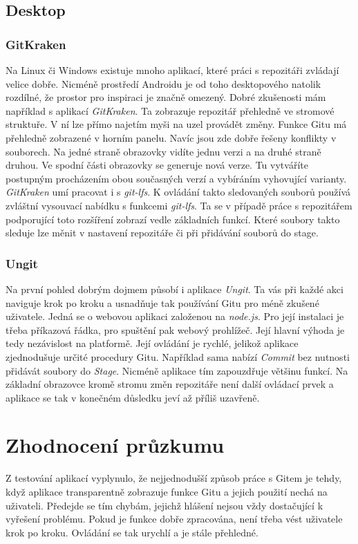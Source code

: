     \subsection {Desktop}
    \subsubsection{GitKraken}
    Na Linux či Windows existuje mnoho aplikací, které práci s repozitáři zvládají velice dobře. Nicméně prostředí Androidu je od toho desktopového natolik rozdílné, že prostor pro inspiraci je značně omezený. Dobré zkušenosti mám například s aplikací \emph{GitKraken}. Ta zobrazuje repozitář přehledně ve stromové struktuře. V ní lze přímo najetím myši na uzel provádět změny. Funkce Gitu má přehledně zobrazené v horním panelu. Navíc jsou zde dobře řešeny konflikty v souborech. Na jedné straně obrazovky vidíte jednu verzi a na druhé straně druhou. Ve spodní části obrazovky se generuje nová verze. Tu vytváříte postupným procházením obou současných verzí a vybíráním vyhovující varianty. \emph{GitKraken} umí pracovat i s \emph{git-lfs}. K ovládání takto sledovaných souborů používá zvláštní vysouvací nabídku s funkcemi \emph{git-lfs}. Ta se v případě práce s repozitářem podporující toto rozšíření zobrazí vedle základních funkcí. Které soubory takto sleduje lze měnit v nastavení repozitáře či při přidávání souborů do stage.

    \subsubsection{Ungit}
    Na první pohled dobrým dojmem působí i aplikace \emph{Ungit}. Ta vás při každé akci naviguje krok po kroku a usnadňuje tak používání Gitu pro méně zkušené uživatele. Jedná se o webovou aplikaci založenou na \emph{node.js}. Pro její instalaci je třeba příkazová řádka, pro spuštění pak webový prohlížeč. Její hlavní výhoda je tedy nezávislost na platformě. Její ovládání je rychlé, jelikož aplikace zjednodušuje určité procedury Gitu. Například sama nabízí \emph{Commit} bez nutnosti přidávát soubory do \emph{Stage}. Nicméně aplikace tím zapouzdřuje většinu funkcí. Na základní obrazovce kromě stromu změn repozitáře není další ovládací prvek a aplikace se tak v konečném důsledku jeví až příliš uzavřeně.

    \section{Zhodnocení průzkumu}
    Z testování aplikací vyplynulo, že nejjednodušší způsob práce s Gitem je tehdy, když aplikace transparentně zobrazuje funkce Gitu a jejich použití nechá na uživateli. Předejde se tím chybám, jejichž hlášení nejsou vždy dostačující k vyřešení problému. Pokud je funkce dobře zpracována, není třeba vést uživatele krok po kroku. Ovládání se tak urychlí a je stále přehledné.

